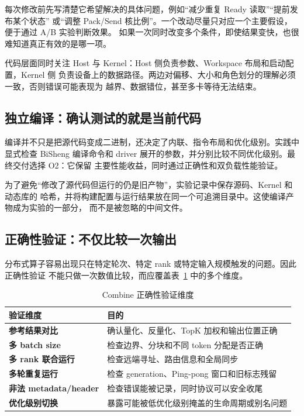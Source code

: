 \documentclass[UTF8,a4paper,11pt]{ctexart}
\begin{document}
每次修改前先写清楚它希望解决的具体问题，例如“减少重复 Ready 读取”“提前发布某个状态”
或“调整 Pack/Send 核比例”。一个改动尽量只对应一个主要假设，便于通过 A/B 实验判断效果。
如果一次同时改变多个条件，即使结果变快，也很难知道真正有效的是哪一项。

代码层面同时关注 Host 与 Kernel：Host 侧负责参数、Workspace 布局和启动配置，Kernel 侧
负责设备上的数据路径。两边对偏移、大小和角色划分的理解必须一致，否则错误可能表现为
越界、数据错位，甚至多卡等待无法结束。

\subsection{独立编译：确认测试的就是当前代码}

编译并不只是把源代码变成二进制，还决定了内联、指令布局和优化级别。实践中显式检查
BiSheng 编译命令和 driver 展开的参数，并分别比较不同优化级别。最终交付选择 O2：它保留
主要性能收益，同时通过正确性和双负载性能验证。

为了避免“修改了源代码但运行的仍是旧产物”，实验记录中保存源码、Kernel 和动态库的
哈希，并将构建配置与运行结果放在同一个可追溯目录中。这使编译产物成为实验的一部分，
而不是被忽略的中间文件。

\subsection{正确性验证：不仅比较一次输出}

分布式算子容易出现只在特定轮次、特定 rank 或特定输入规模触发的问题。因此正确性验证
不能只做一次数值比较，而应覆盖表~\ref{tab:correctness} 中的多个维度。

\begin{table}[htbp]
  \centering
  \caption{Combine 正确性验证维度}
  \label{tab:correctness}
  \begin{tabularx}{\textwidth}{>{\bfseries}p{}X}
    \toprule
    验证维度 & 目的 \\
    \midrule
    参考结果对比 & 确认量化、反量化、TopK 加权和输出位置正确 \\
    多 batch size & 检查边界、分块和不同 token 分配是否正确 \\
    多 rank 联合运行 & 检查远端寻址、路由信息和全局同步 \\
    多轮重复运行 & 检查 generation、Ping-pong 窗口和旧标志残留 \\
    非法 metadata/header & 检查错误能被记录，同时协议可以安全收尾 \\
    优化级别切换 & 暴露可能被低优化级别掩盖的生命周期或别名问题 \\
    \bottomrule
  \end{tabularx}
\end{table}
\end{document}
